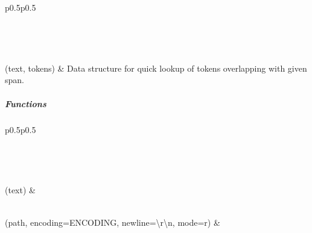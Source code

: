 \documentclass[letterpaper,10pt,english]{sphinxmanual}
\begin{document}
\begin{savenotes}\sphinxatlongtablestart\begin{longtable}[c]{p{0.5\linewidth}p{0.5\linewidth}}
\hline

\endfirsthead

%
{}\\
\hline

\endhead

\hline
{}\\
\endfoot

\endlastfoot

{\hyperref[\detokenize{autoapi/pine/backend/pineiaa/bratiaa/utils/index:pine.backend.pineiaa.bratiaa.utils.TokenOverlap}]{}}(text, tokens)
&
Data structure for quick lookup of tokens overlapping with given span.
\\
\hline
\end{longtable}\sphinxatlongtableend\end{savenotes}


\subparagraph{Functions}
\label{\detokenize{autoapi/pine/backend/pineiaa/bratiaa/utils/index:functions}}

\begin{savenotes}\sphinxatlongtablestart\begin{longtable}[c]{p{0.5\linewidth}p{0.5\linewidth}}
\hline

\endfirsthead

%
{}\\
\hline

\endhead

\hline
{}\\
\endfoot

\endlastfoot

{\hyperref[\detokenize{autoapi/pine/backend/pineiaa/bratiaa/utils/index:pine.backend.pineiaa.bratiaa.utils.tokenize}]{}}(text)
&

\\
\hline
{\hyperref[\detokenize{autoapi/pine/backend/pineiaa/bratiaa/utils/index:pine.backend.pineiaa.bratiaa.utils.read}]{}}(path, encoding=ENCODING, newline=\textquotesingle{}\textbackslash{}r\textbackslash{}n\textquotesingle{}, mode=\textquotesingle{}r\textquotesingle{})
&

\\
\hline
\end{longtable}\sphinxatlongtableend\end{savenotes}
\end{document}
